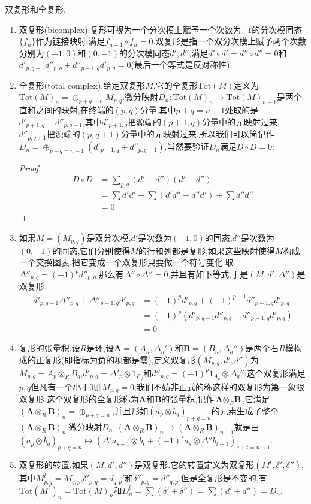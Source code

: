 双复形和全复形.
\begin{enumerate}
	\item 双复形(bicomplex).复形可视为一个分次模上赋予一个次数为$-1$的分次模同态$\{f_n\}$作为链接映射,满足$f_{n-1}\circ f_n=0$.双复形是指一个双分次模上赋予两个次数分别为$(-1,0)$和$(0,-1)$的分次模同态$d',d''$,满足$d'\circ d'=d''\circ d''=0$和$d'_{p,q-1}d''_{p,q}+d''_{p-1,q}d'_{p,q}=0$(最后一个等式是反对称性).
	\item 全复形(total complex).给定双复形$M$,它的全复形$\mathrm{Tot}(M)$定义为$\mathrm{Tot}(M)_n=\oplus_{p+q=n}M_{p,q}$.微分映射$D_n:\mathrm{Tot}(M)_n\to\mathrm{Tot}(M)_{n-1}$是两个直和之间的映射,在终端的$(p,q)$分量,其中$p+q=n-1$处取的是$d'_{p+1,q}+d''_{p,q+1}$,其中$d'_{p+1,q}$把源端的$(p+1,q)$分量中的元映射过来,$d''_{p,q+1}$把源端的$(p,q+1)$分量中的元映射过来.所以我们可以简记作$D_n=\oplus_{p+q=n-1}(d'_{p+1,q}+d''_{p,q+1})$.当然要验证$D_n$满足$D\circ D=0$:
	\begin{proof}
		\begin{align*}
		D\circ D&=\sum_{p,q}(d'+d'')(d'+d'')\\&=\sum d'd'+\sum(d'd''+d''d')+\sum d''d''\\&=0
		\end{align*}
	\end{proof}
    \item 如果$M=(M_{p,q})$是双分次模,$d'$是次数为$(-1,0)$的同态,$d''$是次数为$(0,-1)$的同态,它们分别使得$M$的行和列都是复形,如果这些映射使得$M$构成一个交换图表,把它变成一个双复形只要做一个符号变化:取$\Delta''_{p,q}=(-1)^pd''_{p,q}$,那么有$\Delta''\circ\Delta''=0$,并且有如下等式,于是$(M,d',\Delta'')$是双复形.
    \begin{align*}
    d'_{p,q-1}\Delta''_{p,q}+\Delta''_{p-1,q}d'_{p,q}&=(-1)^pd'_{p,q}+(-1)^{p-1}d''_{p-1,q}d'_{p,q}\\&=(-1)^p(d'_{p,q-1}d''_{p,q}-d''_{p-1,q}d'_{p,q})\\&=0
    \end{align*}
    \item 复形的张量积.设$R$是环,设$\textbf{A}=(A_n,\Delta_n')$和$\textbf{B}=(B_n,\Delta_n'')$是两个右$R$模构成的正复形(即指标为负的项都是零),定义双复形$(M_{p,q},d',d'')$为$M_{p,q}=A_p\otimes_RB_q$,$d'_{p,q}=\Delta'_p\otimes 1_{B_q}$和$d''_{p,q}=(-1)^p1_{A_p}\otimes\Delta_q''$.这个双复形满足$p,q$但凡有一个小于0则$M_{p,q}=0$,我们不妨非正式的称这样的双复形为第一象限双复形.这个双复形的全复形称为$\textbf{A}$和$\textbf{B}$的张量积,记作$\textbf{A}\otimes_R\textbf{B}$,它满足$(\textbf{A}\otimes_R\textbf{B})_n=\oplus_{p+q=n}$,并且形如$(a_p\otimes b_q)_{p+q=n}$的元素生成了整个$(\textbf{A}\otimes_R\textbf{B})_n$.微分映射$D_n:(\textbf{A}\otimes_R\textbf{B})_n\to(\textbf{A}\otimes_R\textbf{B})_{n-1}$就是由$(a_p\otimes b_q)_{p+q=n}\mapsto(\Delta'a_{s+1}\otimes b_t+(-1)^sa_s\otimes\Delta''b_{t+1})_{s+t=n-1}$.
    \item 双复形的转置.如果$(M,d',d'')$是双复形.它的转置定义为双复形$(M^t,\delta',\delta'')$,其中$M^t_{p,q}=M_{q,p}$,$\delta'_{p,q}=d_{q,p}'$和$\delta''_{p,q}=d''_{q,p}$.但是全复形是不变的,有$\mathrm{Tot}(M^t)_n=\mathrm{Tot}(M)_n$和$D_n^t=\sum(\delta'+\delta'')=\sum(d'+d'')=D_n$.
\end{enumerate}

